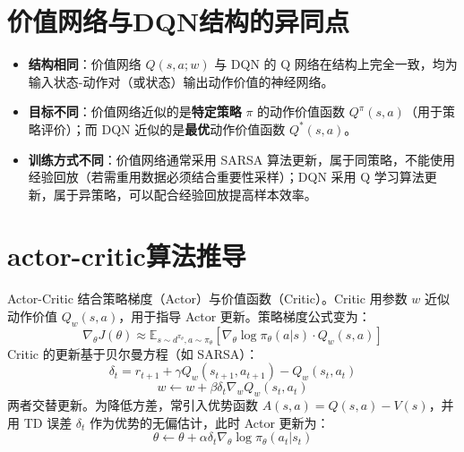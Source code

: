 \documentclass{article}
\begin{document}
\section{价值网络与DQN结构的异同点}
\begin{itemize}
    \item \textbf{结构相同}：价值网络 \(Q(s,a;w)\) 与 DQN 的 Q 网络在结构上完全一致，均为输入状态-动作对（或状态）输出动作价值的神经网络。
    \item \textbf{目标不同}：价值网络近似的是\textbf{特定策略} \(\pi\) 的动作价值函数 \(Q^\pi(s,a)\)（用于策略评价）；而 DQN 近似的是\textbf{最优}动作价值函数 \(Q^*(s,a)\)。
    \item \textbf{训练方式不同}：价值网络通常采用 SARSA 算法更新，属于同策略，不能使用经验回放（若需重用数据必须结合重要性采样）；DQN 采用 Q 学习算法更新，属于异策略，可以配合经验回放提高样本效率。
\end{itemize}

\section{actor-critic算法推导}
Actor-Critic 结合策略梯度（Actor）与价值函数（Critic）。Critic 用参数 \(w\) 近似动作价值 \(Q_w(s,a)\)，用于指导 Actor 更新。策略梯度公式变为：
\[
\nabla_\theta J(\theta) \approx \mathbb{E}_{s \sim d^{\pi_\theta}, a \sim \pi_\theta} \left[ \nabla_\theta \log \pi_\theta(a|s) \cdot Q_w(s,a) \right] \tag{9}
\]
Critic 的更新基于贝尔曼方程（如 SARSA）：
\[
\delta_t = r_{t+1} + \gamma Q_w(s_{t+1},a_{t+1}) - Q_w(s_t,a_t) \tag{10}
\]
\[
w \leftarrow w + \beta \delta_t \nabla_w Q_w(s_t,a_t) \tag{11}
\]
两者交替更新。为降低方差，常引入优势函数 \(A(s,a)=Q(s,a)-V(s)\)，并用 TD 误差 \(\delta_t\) 作为优势的无偏估计，此时 Actor 更新为：
\[
\theta \leftarrow \theta + \alpha \delta_t \nabla_\theta \log \pi_\theta(a_t|s_t) \tag{12}
\]
\end{document}
